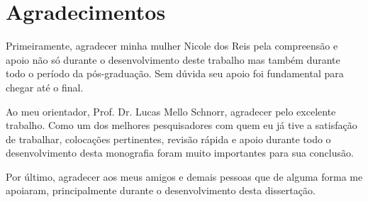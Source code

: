 \chapter*{Agradecimentos}

Primeiramente, agradecer minha mulher Nicole dos Reis pela compreensão e 
apoio não só durante o desenvolvimento deste trabalho mas também durante todo o 
período da pós-graduação. Sem dúvida seu apoio foi fundamental para chegar até 
o final.

Ao meu orientador, Prof. Dr. Lucas Mello Schnorr, agradecer pelo excelente 
trabalho. Como um dos melhores pesquisadores com quem eu já tive a satisfação 
de trabalhar, colocações pertinentes, revisão rápida e apoio durante 
todo o desenvolvimento desta monografia foram muito importantes para sua 
conclusão.

Por último, agradecer aos meus amigos e demais pessoas que de alguma forma me 
apoiaram, principalmente durante o desenvolvimento desta dissertação. 

